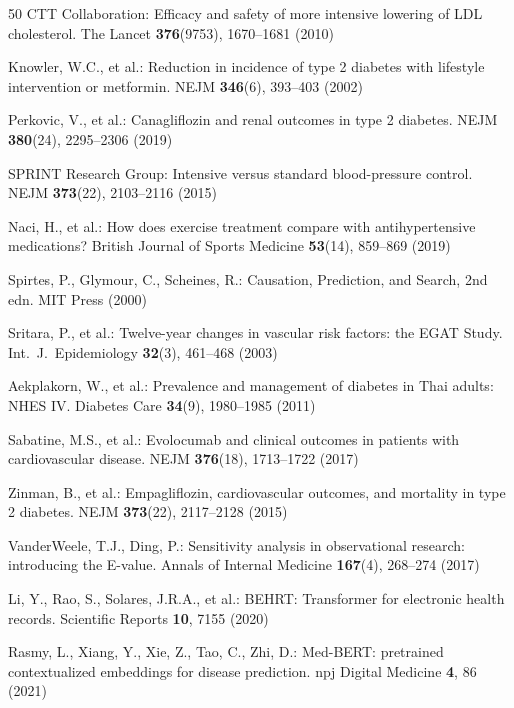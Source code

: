 \documentclass[runningheads]{llncs}
\begin{document}
\begin{thebibliography}{50}
CTT Collaboration:
Efficacy and safety of more intensive lowering of LDL cholesterol.
The Lancet \textbf{376}(9753), 1670--1681 (2010)

Knowler, W.C., et al.:
Reduction in incidence of type 2 diabetes with lifestyle intervention or metformin.
NEJM \textbf{346}(6), 393--403 (2002)

Perkovic, V., et al.:
Canagliflozin and renal outcomes in type 2 diabetes.
NEJM \textbf{380}(24), 2295--2306 (2019)

SPRINT Research Group:
Intensive versus standard blood-pressure control.
NEJM \textbf{373}(22), 2103--2116 (2015)

Naci, H., et al.:
How does exercise treatment compare with antihypertensive medications?
British Journal of Sports Medicine \textbf{53}(14), 859--869 (2019)

Spirtes, P., Glymour, C., Scheines, R.:
Causation, Prediction, and Search, 2nd edn.
MIT Press (2000)

Sritara, P., et al.:
Twelve-year changes in vascular risk factors: the EGAT Study.
Int.\ J.\ Epidemiology \textbf{32}(3), 461--468 (2003)

Aekplakorn, W., et al.:
Prevalence and management of diabetes in Thai adults: NHES IV.
Diabetes Care \textbf{34}(9), 1980--1985 (2011)

Sabatine, M.S., et al.:
Evolocumab and clinical outcomes in patients with cardiovascular disease.
NEJM \textbf{376}(18), 1713--1722 (2017)

Zinman, B., et al.:
Empagliflozin, cardiovascular outcomes, and mortality in type 2 diabetes.
NEJM \textbf{373}(22), 2117--2128 (2015)

VanderWeele, T.J., Ding, P.:
Sensitivity analysis in observational research: introducing the E-value.
Annals of Internal Medicine \textbf{167}(4), 268--274 (2017)

Li, Y., Rao, S., Solares, J.R.A., et al.:
BEHRT: Transformer for electronic health records.
Scientific Reports \textbf{10}, 7155 (2020)

Rasmy, L., Xiang, Y., Xie, Z., Tao, C., Zhi, D.:
Med-BERT: pretrained contextualized embeddings for disease prediction.
npj Digital Medicine \textbf{4}, 86 (2021)


\end{thebibliography}
\end{document}
